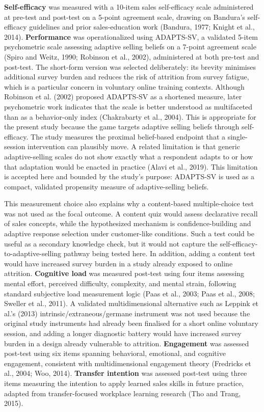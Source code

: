 \documentclass[12pt]{report}
\begin{document}
\textbf{Self-efficacy} was measured with a 10-item sales self-efficacy scale administered at pre-test and post-test on a 5-point agreement scale, drawing on Bandura's self-efficacy guidelines and prior sales-education work (Bandura, 1977; Knight et al., 2014). \textbf{Performance} was operationalized using ADAPTS-SV, a validated 5-item psychometric scale assessing adaptive selling beliefs on a 7-point agreement scale (Spiro and Weitz, 1990; Robinson et al., 2002), administered at both pre-test and post-test. The short-form version was selected deliberately: its brevity minimises additional survey burden and reduces the risk of attrition from survey fatigue, which is a particular concern in voluntary online training contexts. Although Robinson et al. (2002) proposed ADAPTS-SV as a shortened measure, later psychometric work indicates that the scale is better understood as multifaceted than as a behavior-only index (Chakrabarty et al., 2004). This is appropriate for the present study because the game targets adaptive selling beliefs through self-efficacy. The study measures the proximal belief-based endpoint that a single-session intervention can plausibly move. A related limitation is that generic adaptive-selling scales do not show exactly what a respondent adapts to or how that adaptation would be enacted in practice (Alavi et al., 2019). This limitation is accepted here and bounded by the study's purpose: ADAPTS-SV is used as a compact, validated propensity measure of adaptive-selling beliefs.

This measurement choice also explains why a content-based multiple-choice test was not used as the focal outcome. A content quiz would assess declarative recall of sales concepts, while the hypothesized mechanism is confidence-building and adaptive response selection under customer-like conditions. Such a test could be useful as a secondary knowledge check, but it would not capture the self-efficacy-to-adaptive-selling pathway being tested here. In addition, adding a content test would have increased survey burden in a study already exposed to online attrition. \textbf{Cognitive load} was measured post-test using four items assessing mental effort, perceived difficulty, complexity, and mental strain, following standard subjective load measurement logic (Paas et al., 2003; Paas et al., 2008; Sweller et al., 2011). A validated multidimensional alternative such as Leppink et al.'s (2013) intrinsic/extraneous/germane instrument was not used because the original study instruments had already been finalised for a short online voluntary session, and adding a longer diagnostic battery would have increased survey burden in a design already vulnerable to attrition. \textbf{Engagement} was assessed post-test using six items spanning behavioral, emotional, and cognitive engagement, consistent with multidimensional engagement theory (Fredricks et al., 2004; Woo, 2014). \textbf{Transfer intention} was assessed post-test using three items measuring the intention to apply learned sales skills in future practice, adapted from transfer-focused workplace learning research (Tho and Trang, 2015).
\end{document}
